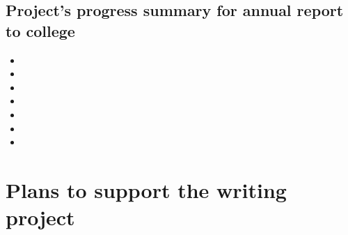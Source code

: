 \documentclass[11pt,letterpaper]{article}
\begin{document}
\subsection{Project's progress summary for annual report to college}
\label{sec:orgc1a7989}

\begin{itemize}
\item 

\item 

\item 

\item 

\item 

\item 

\item 
\end{itemize}



\section{Plans to support the writing project}
\label{sec:org84136fb}

\end{document}
